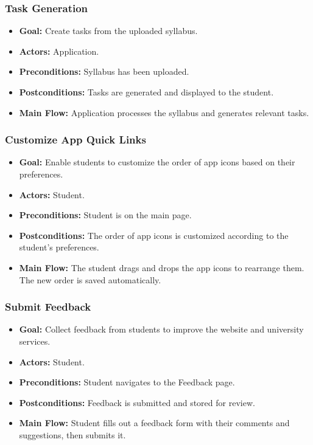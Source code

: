 \documentclass[12pt]{article}
\begin{document}
\subsubsection{Task Generation}
\begin{itemize}
    \item \textbf{Goal:} Create tasks from the uploaded syllabus.
    \item \textbf{Actors:} Application.
    \item \textbf{Preconditions:} Syllabus has been uploaded.
    \item \textbf{Postconditions:} Tasks are generated and displayed to the student.
    \item \textbf{Main Flow:} Application processes the syllabus and generates relevant tasks.
\end{itemize}


\subsubsection{Customize App Quick Links}
\begin{itemize}
    \item \textbf{Goal:} Enable students to customize the order of app icons based on their preferences.
    \item \textbf{Actors:} Student.
    \item \textbf{Preconditions:} Student is on the main page.
    \item \textbf{Postconditions:} The order of app icons is customized according to the student's preferences.
    \item \textbf{Main Flow:} The student drags and drops the app icons to rearrange them. The new order is saved automatically.
\end{itemize}

\subsubsection{Submit Feedback}
\begin{itemize}
    \item \textbf{Goal:} Collect feedback from students to improve the website and university services.
    \item \textbf{Actors:} Student.
    \item \textbf{Preconditions:} Student navigates to the Feedback page.
    \item \textbf{Postconditions:} Feedback is submitted and stored for review.
    \item \textbf{Main Flow:} Student fills out a feedback form with their comments and suggestions, then submits it. 
\end{itemize}
\end{document}
